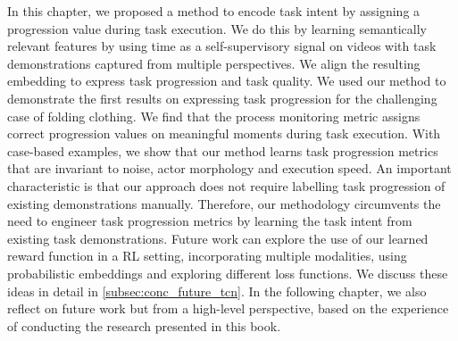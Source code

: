 \documentclass[\home/main.tex]{subfiles}
\begin{document}
In this chapter, we proposed a method to encode task intent by assigning a progression value during task execution. We do this by learning semantically relevant features by using time as a self-supervisory signal on videos with task demonstrations captured from multiple perspectives. We align the resulting embedding to express task progression and task quality. We used our method to demonstrate the first results on expressing task progression for the challenging case of folding clothing. We find that the process monitoring metric assigns correct progression values on meaningful moments during task execution. With case-based examples, we show that our method learns task progression metrics that are invariant to noise, actor morphology and execution speed. An important characteristic is that our approach does not require labelling task progression of existing demonstrations manually. Therefore, our methodology circumvents the need to engineer task progression metrics by learning the task intent from existing task demonstrations. Future work can explore the use of our learned reward function in a \gls{RL} setting, incorporating multiple modalities, using probabilistic embeddings and exploring different loss functions. We discuss these ideas in detail in \cref{subsec:conc_future_tcn}. In the following chapter, we also reflect on future work but from a high-level perspective, based on the experience of conducting the research presented in this book.
\end{document}
